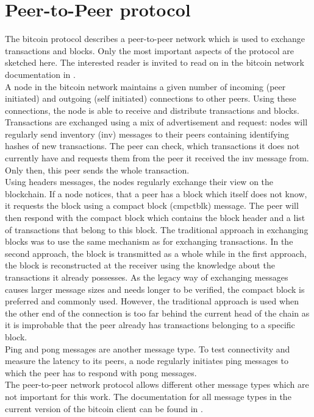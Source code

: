 \section{Peer-to-Peer protocol}
The bitcoin protocol describes a peer-to-peer network which is used to exchange transactions and blocks. Only the most important aspects of the protocol are sketched here. The interested reader is invited to read on in the bitcoin network documentation in \cite{bitcoinNetworkProtocol}.\\
A node in the bitcoin network maintains a given number of incoming (peer initiated) and outgoing (self initiated) connections to other peers. Using these connections, the node is able to receive and distribute transactions and blocks. Transactions are exchanged using a mix of advertisement and request: nodes will regularly send inventory (inv) messages to their peers containing identifying hashes of new transactions. The peer can check, which transactions it does not currently have and requests them from the peer it received the inv message from. Only then, this peer sends the whole transaction.\\
Using headers messages, the nodes regularly exchange their view on the blockchain. If a node notices, that a peer has a block which itself does not know, it requests the block using a compact block (cmpctblk) message. The peer will then respond with the compact block which contains the block header and a list of transactions that belong to this block. The traditional approach in exchanging blocks was to use the same mechanism as for exchanging transactions. In the second approach, the block is transmitted as a whole while in the first approach, the block is reconstructed at the receiver using the knowledge about the transactions it already possesses. As the legacy way of exchanging messages causes larger message sizes and needs longer to be verified, the compact block is preferred and commonly used. However, the traditional approach is used when the other end of the connection is too far behind the current head of the chain as it is improbable that the peer already has transactions belonging to a specific block.\\
Ping and pong messages are another message type. To test connectivity and measure the latency to its peers, a node regularly initiates ping messages to which the peer has to respond with pong messages.\\
The peer-to-peer network protocol allows different other message types which are not important for this work. The documentation for all message types in the current version of the bitcoin client can be found in \cite{bitcoinNetworkProtocol}.


